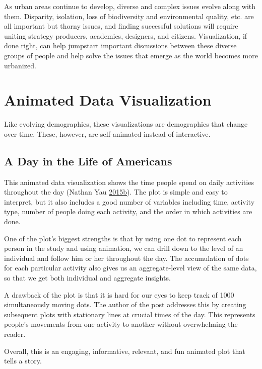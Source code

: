 \documentclass[]{book}
\begin{document}
As urban areas continue to develop, diverse and complex issues evolve along with them. Disparity, isolation, loss of biodiversity and environmental quality, etc. are all important but thorny issues, and finding successful solutions will require uniting strategy producers, academics, designers, and citizens. Visualization, if done right, can help jumpstart important discussions between these diverse groups of people and help solve the issues that emerge as the world becomes more urbanized.

\hypertarget{animated-data-visualization}{%
\section{Animated Data Visualization}\label{animated-data-visualization}}

Like evolving demographics, these visualizations are demographics that change over time. These, however, are self-animated instead of interactive.

\hypertarget{a-day-in-the-life-of-americans}{%
\subsection{A Day in the Life of Americans}\label{a-day-in-the-life-of-americans}}

This animated data visualization shows the time people spend on daily activities throughout the day (Nathan Yau \protect\hyperlink{ref-American_life}{2015}\protect\hyperlink{ref-American_life}{b}). The plot is simple and easy to interpret, but it also includes a good number of variables including time, activity type, number of people doing each activity, and the order in which activities are done.

One of the plot's biggest strengths is that by using one dot to represent each person in the study and using animation, we can drill down to the level of an individual and follow him or her throughout the day. The accumulation of dots for each particular activity also gives us an aggregate-level view of the same data, so that we get both individual and aggregate insights.

A drawback of the plot is that it is hard for our eyes to keep track of 1000 simultaneously moving dots. The author of the post addresses this by creating subsequent plots with stationary lines at crucial times of the day. This represents people's movements from one activity to another without overwhelming the reader.

Overall, this is an engaging, informative, relevant, and fun animated plot that tells a story.
\end{document}

